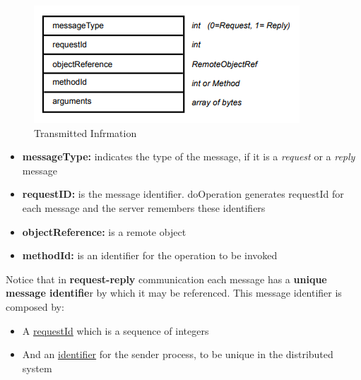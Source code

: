 \begin{figure}[!h]
    \centering
    \includegraphics[width=.7\linewidth]{images/requestReplayCommunication/informatioTransmitted.png}
    \caption{Transmitted Infrmation}
\end{figure}

\begin{itemize}
    \item \textbf{messageType:} indicates the type of the message, if it is a \textit{request} or a \textit{reply} message
    \item \textbf{requestID:} is the message identifier. doOperation generates  requestId for each message and the server remembers these identifiers
    \item \textbf{objectReference:} is a remote object
    \item \textbf{methodId:} is an identifier for the operation to be invoked
\end{itemize}
Notice that in \textbf{request-reply} communication each message has a \textbf{unique message identifie}r by which it may be referenced. This message identifier is composed by:
\begin{itemize}
    \item A \underline{requestId} which is a sequence of integers
    \item And an \underline{identifier} for the sender process, to be unique in the distributed system
\end{itemize}

